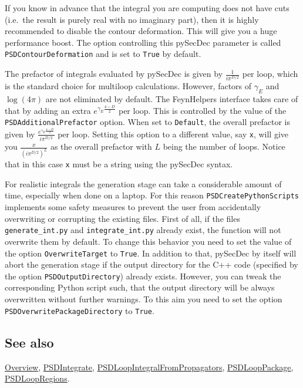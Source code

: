 \documentclass[../FeynHelpersManual.tex]{subfiles}
\begin{document}
If you know in advance that the integral you are computing does not have
cuts (i.e.~the result is purely real with no imaginary part), then it is
highly recommended to disable the contour deformation. This will give
you a huge performance boost. The option controlling this pySecDec
parameter is called \texttt{PSDContourDeformation} and is set to
\texttt{True} by default.

The prefactor of integrals evaluated by pySecDec is given by
\(\frac{1}{i \pi^{D/2}}\) per loop, which is the standard choice for
multiloop calculations. However, factors of \(\gamma_E\) and
\(\log(4\pi)\) are not eliminated by default. The FeynHelpers interface
takes care of that by adding an extra \(e^{\gamma_E \frac{4-D}{2}}\) per
loop. This is controlled by the value of the
\texttt{PSDAdditionalPrefactor} option. When set to \texttt{Default},
the overall prefactor is given by
\(\frac{e^{\gamma_E \frac{4-D}{2}}}{i \pi^{D/2}}\) per loop. Setting
this option to a different value, say \texttt{x}, will give you
\(\frac{x}{(i \pi^{D/2})^L}\) as the overall prefactor with \(L\) being
the number of loops. Notice that in this case \texttt{x} must be a
string using the pySecDec syntax.

For realistic integrals the generation stage can take a considerable
amount of time, especially when done on a laptop. For this reason
\texttt{PSDCreatePythonScripts} implements some safety measures to
prevent the user from accidentally overwriting or corrupting the
existing files. First of all, if the files \texttt{generate_int.py} and
\texttt{integrate_int.py} already exist, the function will not overwrite
them by default. To change this behavior you need to set the value of
the option \texttt{OverwriteTarget} to \texttt{True}. In addition to
that, pySecDec by itself will abort the generation stage if the output
directory for the C++ code (specified by the option
\texttt{PSDOutputDirectory}) already exists. However, you can tweak the
corresponding Python script such, that the output directory will be
always overwritten without further warnings. To this aim you need to set
the option \texttt{PSDOverwritePackageDirectory} to \texttt{True}.

\subsection{See also}

\hyperlink{toc}{Overview}, \hyperlink{psdintegrate}{PSDIntegrate},
\hyperlink{psdloopintegralfrompropagators}{PSDLoopIntegralFromPropagators},
\hyperlink{psdlooppackage}{PSDLoopPackage},
\hyperlink{psdloopregions}{PSDLoopRegions}.
\end{document}
